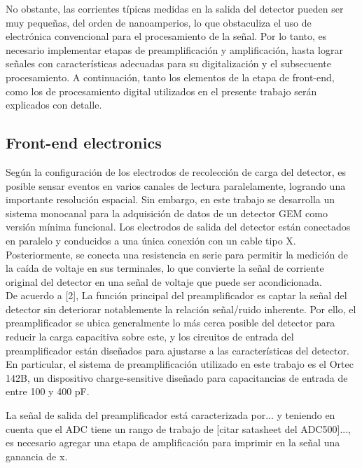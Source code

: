 \documentclass[]{book}
\begin{document}
\noindent No obstante, las corrientes típicas medidas en la salida del detector pueden ser muy pequeñas, del orden de nanoamperios, lo que obstaculiza el uso de electrónica convencional para el procesamiento de la señal. Por lo tanto, es necesario implementar etapas de preamplificación y amplificación, hasta lograr señales con características adecuadas para su digitalización y el subsecuente procesamiento. A continuación, tanto los elementos de la etapa de front-end, como los de procesamiento digital utilizados en el presente trabajo serán explicados con detalle.

\subsection*{Front-end electronics}

\noindent Según la configuración de los electrodos de recolección de carga del detector, es posible sensar eventos en varios canales de lectura paralelamente, logrando una importante resolución espacial. Sin embargo, en este trabajo se desarrolla un sistema monocanal para la adquisición de datos de un detector GEM como versión mínima funcional. Los electrodos de salida del detector están conectados en paralelo y conducidos a una única conexión con un cable tipo X. Posteriormente, se conecta una resistencia en serie para permitir la medición de la caída de voltaje en sus terminales, lo que convierte la señal de corriente original del detector en una señal de voltaje que puede ser acondicionada.\\


\noindent De acuerdo a [2], La función principal del preamplificador es captar la señal del detector sin deteriorar notablemente la relación señal/ruido inherente. Por ello, el preamplificador se ubica generalmente lo más cerca posible del detector para reducir la carga capacitiva sobre este, y los circuitos de entrada del preamplificador están diseñados para ajustarse a las características del detector. En particular, el sistema de preamplificación utilizado en este trabajo es el Ortec 142B, un dispositivo charge-sensitive diseñado para capacitancias de entrada de entre 100 y 400 pF. %

La señal de salida del preamplificador está caracterizada por... y teniendo en cuenta que el ADC tiene un rango de trabajo de [citar satasheet del ADC500]..., es necesario agregar una etapa de amplificación para imprimir en la señal una ganancia de x.\\
\end{document}
